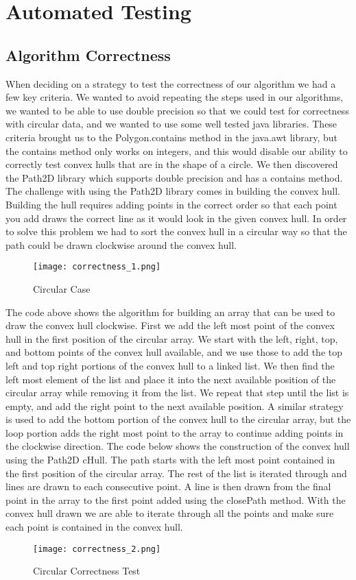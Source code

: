 \documentclass{article}
\begin{document}
{  \section{Automated Testing}
  \subsection{Algorithm Correctness}
  When deciding on a strategy to test the correctness of our algorithm we had a few key criteria. We wanted to avoid repeating the steps used in our algorithms, we wanted to be able to use double precision so that we could test for correctness with circular data, and we wanted to use some well tested java libraries. These criteria brought us to the Polygon.contains method in the java.awt library, but the contains method only works on integers, and this would disable our ability to correctly test convex hulls that are in the shape of a circle. We then discovered the Path2D library which supports double precision and has a contains method. The challenge with using the Path2D library comes in building the convex hull. Building the hull requires adding points in the correct order so that each point you add draws the correct line as it would look in the given convex hull. In order to solve this problem we had to sort the convex hull in a circular way so that the path could be drawn clockwise around the convex hull.
  \begin{figure}[H]
    \texttt{[image: correctness\_1.png]}
    \caption{Circular Case}
    \label{fig:correctness_1}
  \end{figure} 
  The code above shows the algorithm for building an array that can be used to draw the convex hull clockwise. First we add the left most point of the convex hull in the first position of the circular array. We start with the left, right, top, and bottom points of the convex hull available, and we use those to add the top left and top right portions of the convex hull to a linked list. We then find the left most element of the list and place it into the next available position of the circular array while removing it from the list. We repeat that step until the list is empty, and add the right point to the next available position. A similar strategy is used to add the bottom portion of the convex hull to the circular array, but the loop portion adds the right most point to the array to continue adding points in the clockwise direction. The code below shows the construction of the convex hull using the Path2D cHull. The path starts with the left most point contained in the first position of the circular array. The rest of the list is iterated through and lines are drawn to each consecutive point. A line is then drawn from the final point in the array to the first point added using the closePath method. With the convex hull drawn we are able to iterate through all the points and make sure each point is contained in the convex hull.
  \begin{figure}[H]
    \texttt{[image: correctness\_2.png]}
    \caption{Circular Correctness Test}
    \label{fig:correctness_2}
  \end{figure} 


}
\end{document}
